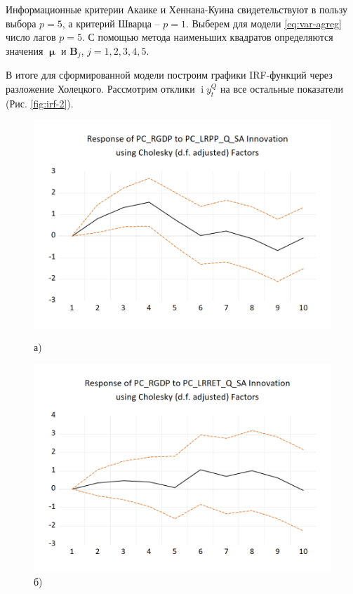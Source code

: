 \documentclass[a4paper, 14pt]{extreport}
\numberwithin{equation}{section}
\renewcommand{\mu}{\upmu}
\renewcommand{\i}{\operatorname{i}}
\numberwithin{equation}{section}
\begin{document}
	Информационные критерии Акаике и Хеннана-Куина свидетельствуют в пользу выбора $p=5$, а критерий Шварца -- $p=1$. Выберем для модели \eqref{eq:var-agreg} число лагов $p=5$. С помощью метода наименьших квадратов определяются значения $\mathbf \mu$ и $\mathbf B_j$, $j=1,2,3,4,5$.
	
	В итоге для сформированной модели построим графики IRF-функций через разложение Холецкого. Рассмотрим отклики $\i y_t^Q$ на все остальные показатели (Рис. \ref{fig:irf-2}).
	
	\begin{figure}[h!]
		\centering
		\begin{minipage}{0.5\textwidth}
			\centering
			\includegraphics[scale=0.4]{images/image35}
			\caption*{а)}
		\end{minipage}%
		\begin{minipage}{0.5\textwidth}
			\centering
			\includegraphics[scale=0.4]{images/image36}
			\caption*{б)}
		\end{minipage}%
		

\end{figure}
\end{document}
